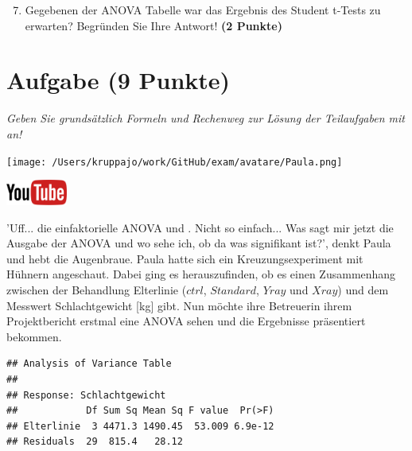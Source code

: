 \documentclass[a4paper, 9pt]{scrartcl}\usepackage[]{graphicx}\usepackage[]{xcolor}
\makeatletter
\newenvironment{kframe}{%
 \def\at@end@of@kframe{}%
 \ifinner\ifhmode%
  \def\at@end@of@kframe{\end{minipage}}%
  \begin{minipage}{\columnwidth}%
 \fi\fi%
 \def\FrameCommand##1{\hskip\@totalleftmargin \hskip-\fboxsep
 \colorbox{shadecolor}{##1}\hskip-\fboxsep
     \hskip-\linewidth \hskip-\@totalleftmargin \hskip\columnwidth}%
 \MakeFramed {\advance\hsize-\width
   \@totalleftmargin\z@ \linewidth\hsize
   \@setminipage}}%
 {\par\unskip\endMakeFramed%
 \at@end@of@kframe}
\newenvironment{knitrout}{}{} %
\makeatother
\begin{document}
\begin{enumerate}
  \setcounter{enumi}{6}
\item Gegebenen der ANOVA Tabelle war das Ergebnis des Student t-Tests zu erwarten? Begründen Sie Ihre Antwort! \textbf{(2 Punkte)}
\end{enumerate}

 
\clearpage

\section{Aufgabe \hfill (9 Punkte)}

\textit{Geben Sie grundsätzlich Formeln und Rechenweg zur Lösung der Teilaufgaben mit an!} \\[1Ex]
 

 
\begin{minipage}[t]{0.5\textwidth}
\texttt{[image: /Users/kruppajo/work/GitHub/exam/avatare/Paula.png]}
\end{minipage}
\begin{minipage}[t]{0.5\textwidth}
\hfill
\href{https://youtu.be/aXvxGC4YLqk}{\includegraphics[width = 2cm]{img/youtube}}\\[1Ex]
\end{minipage}
\vspace{1ex}



'Uff... die einfaktorielle ANOVA und \Rlogo. Nicht so einfach... Was sagt mir jetzt die Ausgabe der ANOVA und wo sehe ich, ob da was signifikant ist?', denkt Paula und hebt die Augenbraue. Paula hatte sich ein Kreuzungsexperiment mit Hühnern angeschaut. Dabei ging es herauszufinden, ob es einen Zusammenhang zwischen der Behandlung Elterlinie ($ctrl$, $Standard$, $Yray$ und $Xray$) und dem Messwert Schlachtgewicht [kg] gibt. Nun möchte ihre Betreuerin ihrem Projektbericht erstmal eine ANOVA sehen und die Ergebnisse präsentiert bekommen.

\begin{knitrout}
\color{fgcolor}\begin{kframe}
\begin{verbatim}
## Analysis of Variance Table
## 
## Response: Schlachtgewicht
##            Df Sum Sq Mean Sq F value  Pr(>F)
## Elterlinie  3 4471.3 1490.45  53.009 6.9e-12
## Residuals  29  815.4   28.12
\end{verbatim}
\end{kframe}
\end{knitrout}
\end{document}

